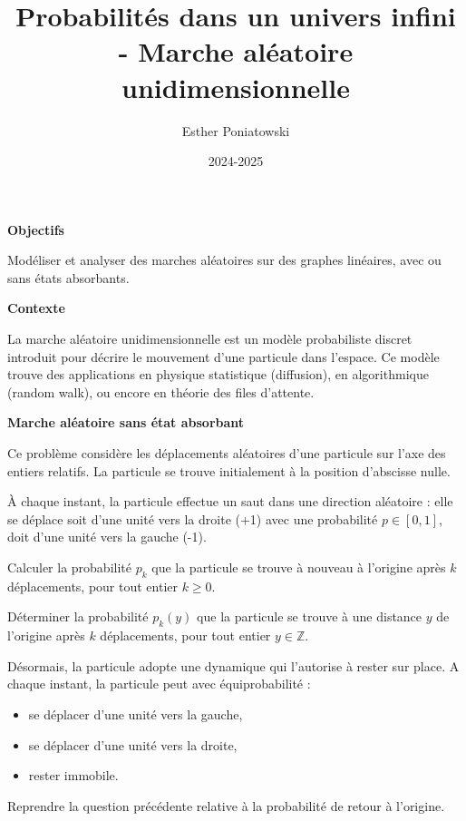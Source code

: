 \documentclass[10pt,a4paper]{article}
\title{Probabilités dans un univers infini - Marche aléatoire unidimensionnelle}
\author{Esther Poniatowski}
\date{2024-2025}
\begin{document}
\textbf{Objectifs}

Modéliser et analyser des marches aléatoires sur des graphes linéaires, avec ou sans états
absorbants.

\bigskip
\textbf{Contexte}

La marche aléatoire unidimensionnelle est un modèle probabiliste discret introduit pour décrire le
mouvement d'une particule dans l'espace. Ce modèle trouve des applications en physique statistique
(diffusion), en algorithmique (random walk), ou encore en théorie des files d'attente.

\bigskip
\textbf{Marche aléatoire sans état absorbant}

Ce problème considère les déplacements aléatoires d'une particule sur l'axe des entiers relatifs. La
particule se trouve initialement à la position d'abscisse nulle.

À chaque instant, la particule effectue un saut dans une direction aléatoire : elle se déplace soit
d'une unité vers la droite (+1) avec une probabilité \( p \in [0, 1] \), doit d'une unité vers la
gauche (-1).

\q Calculer la probabilité \( p_k \) que la particule se trouve à nouveau à l'origine après \( k \)
déplacements, pour tout entier \( k \geq 0 \).

\q Déterminer la probabilité \( p_k(y) \) que la particule se trouve à une distance \( y \) de
l'origine après \( k \) déplacements, pour tout entier \( y \in \mathbb{Z} \).

\bigskip

Désormais, la particule adopte une dynamique qui l'autorise à rester sur place. A chaque instant, la
particule peut avec équiprobabilité :
\begin{itemize}
 \item se déplacer d'une unité vers la gauche,
 \item se déplacer d'une unité vers la droite,
 \item rester immobile.
\end{itemize}

\q Reprendre la question précédente relative à la probabilité de retour à l'origine.
\end{document}
